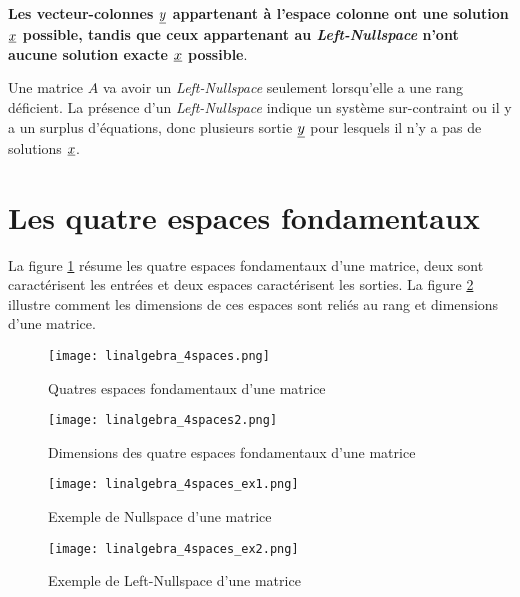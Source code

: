 \textbf{Les vecteur-colonnes $\underline{y}$ appartenant à l'espace colonne ont une solution $\underline{x}$ possible, tandis que ceux appartenant au \textit{Left-Nullspace} n'ont aucune solution exacte $\underline{x}$ possible}.

Une matrice $A$ va avoir un \textit{Left-Nullspace} seulement lorsqu'elle a une rang déficient. La présence d'un \textit{Left-Nullspace} indique un système sur-contraint ou il y a un surplus d'équations, donc plusieurs sortie $\underline{y}$ pour lesquels il n'y a pas de solutions $\underline{x}$.


\section{Les quatre espaces fondamentaux}
\label{sec:4espfond}

La figure \ref{fig:4spaces} résume les quatre espaces fondamentaux d'une matrice, deux sont caractérisent les entrées et deux espaces caractérisent les sorties. La figure \ref{fig:4spaces2} illustre comment les dimensions de ces espaces sont reliés au rang et dimensions d'une matrice.

\begin{figure}[H]
	\centering
		\texttt{[image: linalgebra\_4spaces.png]}
	\caption{Quatres espaces fondamentaux d'une matrice}
	\label{fig:4spaces}
\end{figure}

\begin{figure}[H]
	\centering
		\texttt{[image: linalgebra\_4spaces2.png]}
	\caption{Dimensions des quatre espaces fondamentaux d'une matrice}
	\label{fig:4spaces2}
\end{figure}

\begin{figure}[H]
	\centering
		\texttt{[image: linalgebra\_4spaces\_ex1.png]}
	\caption{Exemple de Nullspace d'une matrice}
	\label{fig:4spaces_ex1}
\end{figure}

\begin{figure}[H]
	\centering
		\texttt{[image: linalgebra\_4spaces\_ex2.png]}
	\caption{Exemple de Left-Nullspace d'une matrice}
	\label{fig:4spaces_ex2}
\end{figure}


